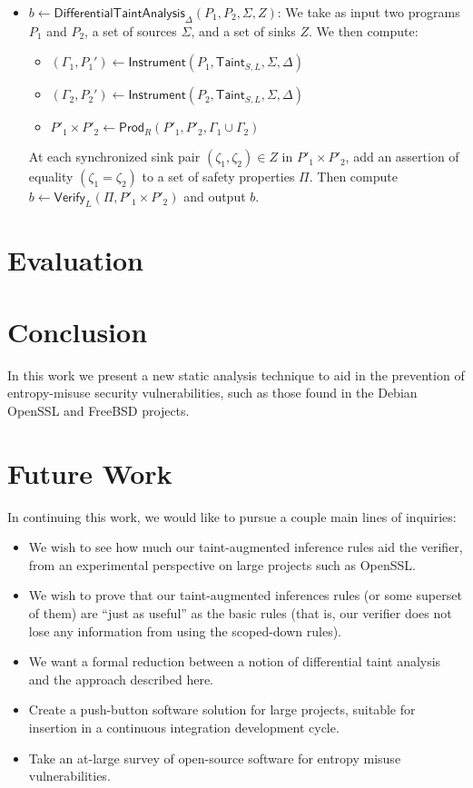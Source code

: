 \documentclass[letterpaper,twocolumn,10pt]{article}
\begin{document}
\begin{itemize}
    \item $b \gets \mathsf{DifferentialTaintAnalysis}_\Delta(P_1, P_2, \Sigma, Z)$: We take 
    as input two programs $P_1$ and $P_2$, a set of sources $\Sigma$, and a set of 
    sinks $Z$. We then compute:
    \begin{itemize}
        \item $(\Gamma_1, P_1') \gets \mathsf{Instrument}(P_1, \mathsf{Taint}_{S,L}, \Sigma, \Delta)$
        \item $(\Gamma_2, P_2') \gets \mathsf{Instrument}(P_2, \mathsf{Taint}_{S,L}, \Sigma, \Delta)$
        \item $P'_1 \times P'_2 \gets \mathsf{Prod}_R(P'_1, P'_2, \Gamma_1 \cup \Gamma_2)$
    \end{itemize}
    At each synchronized sink pair $(\zeta_1, \zeta_2) \in Z$ in $P'_1 \times P'_2$, add an assertion of equality 
    $(\zeta_1 = \zeta_2)$ to a set of safety properties $\Pi$. Then compute $b \gets \mathsf{Verify}_{L}(\Pi, P'_1 \times P'_2)$
    and output $b$.
\end{itemize}

\section{Evaluation}
\label{sec:eval}


\section{Conclusion}

In this work we present a new static analysis technique to aid in the prevention of entropy-misuse security vulnerabilities, such as those
found in the Debian OpenSSL and FreeBSD projects.

\section{Future Work}

In continuing this work, we would like to pursue a couple main lines of inquiries:

\begin{itemize}
    \item We wish to see how much our taint-augmented inference rules aid the verifier, from an experimental perspective on large projects such as OpenSSL.
    \item We wish to prove that our taint-augmented inferences rules (or some superset of them) are ``just as useful'' as the basic rules (that is,
    our verifier does not lose any information from using the scoped-down rules).
    \item We want a formal reduction between a notion of differential taint analysis and the approach described here.
    \item Create a push-button software solution for large projects, suitable for insertion in a continuous integration development cycle.
    \item Take an at-large survey of open-source software for entropy misuse vulnerabilities.
\end{itemize}
\end{document}
